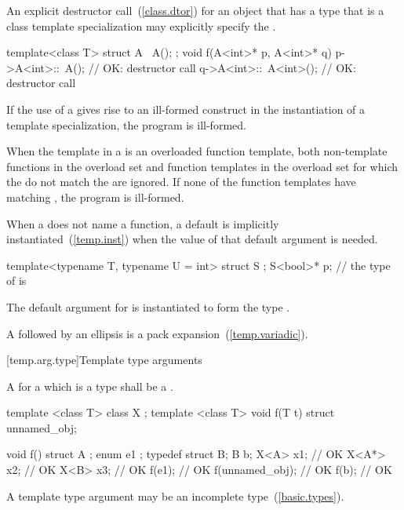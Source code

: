 \pnum
An explicit destructor call~(\ref{class.dtor}) for an object that has a type
that is a class template specialization may explicitly specify the
.
\begin{example}

\begin{codeblock}
template<class T> struct A {
  ~A();
};
void f(A<int>* p, A<int>* q) {
  p->A<int>::~A();              // OK: destructor call
  q->A<int>::~A<int>();         // OK: destructor call
}
\end{codeblock}
\end{example}

\pnum
If the use of a
gives rise to an ill-formed construct in the instantiation of a
template specialization, the program is ill-formed.

\pnum
When the template in a
is an overloaded function template, both non-template functions in the overload
set and function templates in the overload set for
which the
do not match the
are ignored.
If none of the function templates have matching
,
the program is ill-formed.

\pnum
When a  does not name a function,
a default  is
implicitly instantiated~(\ref{temp.inst})
when the value of that default argument is needed.
\begin{example}
\begin{codeblock}
template<typename T, typename U = int> struct S { };
S<bool>* p;         // the type of  is 
\end{codeblock}
The default argument for  is instantiated to form the type .
\end{example}

\pnum
A  followed by an ellipsis is
a pack expansion~(\ref{temp.variadic}).

[temp.arg.type]{Template type arguments}

\pnum
A
for a
which is a type
shall be a
.

\pnum
\begin{example}
\begin{codeblock}
template <class T> class X { };
template <class T> void f(T t) { }
struct { } unnamed_obj;

void f() {
  struct A { };
  enum { e1 };
  typedef struct { } B;
  B b;
  X<A> x1;          // OK
  X<A*> x2;         // OK
  X<B> x3;          // OK
  f(e1);            // OK
  f(unnamed_obj);   // OK
  f(b);             // OK
}
\end{codeblock}
\end{example}
\begin{note}
A template type argument may be an incomplete type~(\ref{basic.types}).
\end{note}

